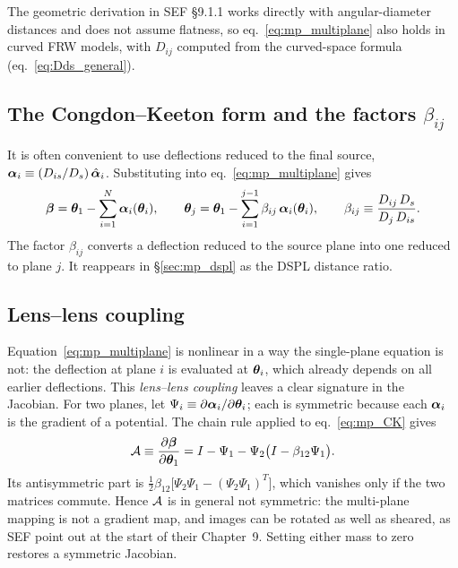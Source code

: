 The geometric derivation in SEF \S9.1.1 works directly with
angular-diameter distances and does not assume flatness, so
eq.~\eqref{eq:mp_multiplane} also holds in curved FRW models, with
$D_{ij}$ computed from the curved-space formula
(eq.~\eqref{eq:Dds_general}).

\subsection{The Congdon--Keeton form and the factors $\beta_{ij}$}

It is often convenient to use deflections reduced to the final source,
$\boldsymbol{\alpha}_i\equiv(D_{is}/D_s)\,\hat{\boldsymbol{\alpha}}_i$.  Substituting into
eq.~\eqref{eq:mp_multiplane} gives
\citep[\S4.8, eqs.~4.99a--c]{congdon_principles_2018}
\begin{equation}
    \boldsymbol{\beta}=\boldsymbol{\theta}_1-\sum_{i=1}^{N}\boldsymbol{\alpha}_i(\boldsymbol{\theta}_i),\qquad
    \boldsymbol{\theta}_j=\boldsymbol{\theta}_1-\sum_{i=1}^{j-1}\beta_{ij}\,\boldsymbol{\alpha}_i(\boldsymbol{\theta}_i),\qquad
    \beta_{ij}\equiv\frac{D_{ij}\,D_s}{D_j\,D_{is}} .
    \label{eq:mp_CK}
\end{equation}
The factor $\beta_{ij}$ converts a deflection reduced to the source
plane into one reduced to plane $j$.  It reappears in
\S\ref{sec:mp_dspl} as the DSPL distance ratio.  

\subsection{Lens--lens coupling}

Equation~\eqref{eq:mp_multiplane} is nonlinear in a way the single-plane
equation is not: the deflection at plane $i$ is evaluated at
$\boldsymbol{\theta}_i$, which already depends on all earlier deflections.  This
\emph{lens--lens coupling} leaves a clear signature in the Jacobian.
For two planes, let $\Psi_i\equiv\partial\boldsymbol{\alpha}_i/\partial\boldsymbol{\theta}_i$;
each is symmetric because each $\boldsymbol{\alpha}_i$ is the gradient of a
potential.  The chain rule applied to eq.~\eqref{eq:mp_CK} gives
\begin{equation}
    \mathcal{A}\equiv\frac{\partial \boldsymbol{\beta}}{\partial \boldsymbol{\theta}_1}
    = I-\Psi_1-\Psi_2\big(I-\beta_{12}\Psi_1\big).
    \label{eq:mp_jacobian}
\end{equation}
Its antisymmetric part is
$\tfrac12\beta_{12}\big[\Psi_2\Psi_1-(\Psi_2\Psi_1)^{T}\big]$, which
vanishes only if the two matrices commute.  Hence $\mathcal{A}$ is in general
not symmetric: the multi-plane mapping is not a gradient map, and
images can be rotated as well as sheared, as SEF point out at the start
of their Chapter~9.  Setting either mass to zero restores a symmetric
Jacobian.  

